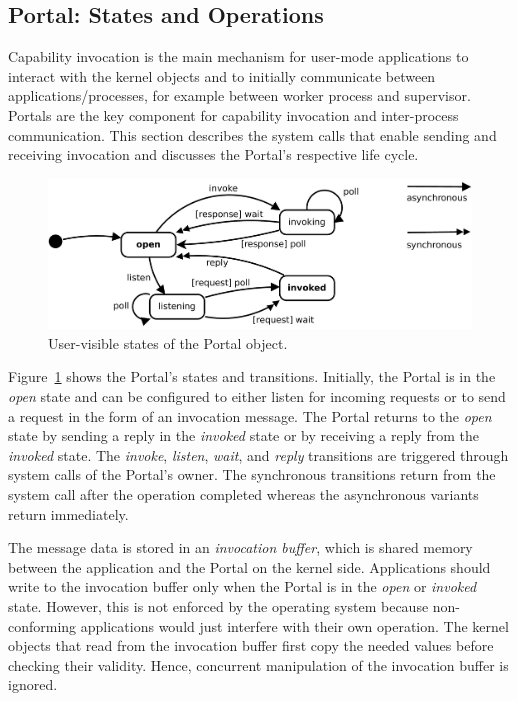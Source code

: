 \subsection{Portal: States and Operations}
\label{sec:portal-dyn}

Capability invocation is the main mechanism for user-mode applications to interact with the kernel objects and to initially communicate between applications/processes, for example between worker process and supervisor. Portals  are the key component for capability invocation and inter-process communication. This section describes the system calls that enable sending and receiving invocation and discusses the Portal's respective life cycle.

\begin{figure}
\begin{center}
\includegraphics[scale=0.25]{fig/portal.pdf}
\caption{User-visible states of the Portal object.}
\label{fig:portal:state}
\end{center}
\end{figure}

Figure~\ref{fig:portal:state} shows the Portal's states and transitions. Initially, the Portal is in the \emph{open} state and can be configured to either listen for incoming requests or to send a request in the form of an invocation message. The Portal returns to the \emph{open} state by sending a reply in the \emph{invoked} state or by receiving a reply from the \emph{invoked} state. The \emph{invoke}, \emph{listen}, \emph{wait}, and \emph{reply} transitions are triggered through system calls of the Portal's owner. The synchronous transitions return from the system call after the operation completed whereas the asynchronous variants return immediately. 

The message data is stored in an \emph{invocation buffer}, which is shared memory between the application and the Portal on the kernel side. Applications should write to the invocation buffer only when the Portal is in the \emph{open} or \emph{invoked} state. However, this is not enforced by the operating system because non-conforming applications would just interfere with their own operation. The kernel objects that read from the invocation buffer first copy the needed values before checking their validity. Hence, concurrent manipulation of the invocation buffer is ignored.

